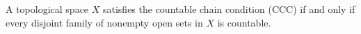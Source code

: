 A topological space $X$ satisfies the countable chain condition (CCC) if and only if every disjoint family of nonempty open sets in $X$ is countable.
